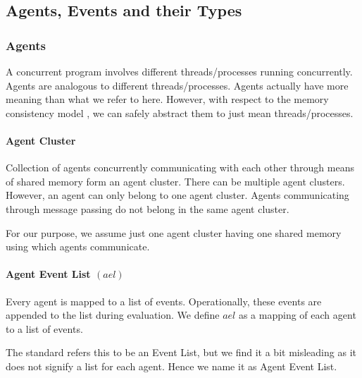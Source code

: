 \subsection{Agents, Events and their Types}

    \subsubsection{Agents}
        A concurrent program involves different threads/processes running concurrently. Agents are analogous to different threads/processes. Agents actually have more meaning than what we refer to here. However, with respect to the memory consistency model , we can safely abstract them to just mean threads/processes.
        \paragraph{Agent Cluster}
        Collection of agents concurrently communicating with each other through means of shared memory form an agent cluster.  There can be multiple agent clusters. However, an agent can only belong to one agent cluster. Agents communicating through message passing do not belong in the same agent cluster. 

        For our purpose, we assume just one agent cluster having one shared memory using which agents communicate. 

        \paragraph{Agent Event List $(ael)$}
        Every agent is mapped to a list of events. Operationally, these events are appended to the list during evaluation. We define $ael$ as a mapping of each agent to a list of events.
        
        The standard refers this to be an Event List, but we find it a bit misleading as it does not signify a list for each agent. Hence we name it as Agent Event List. 

        

            

